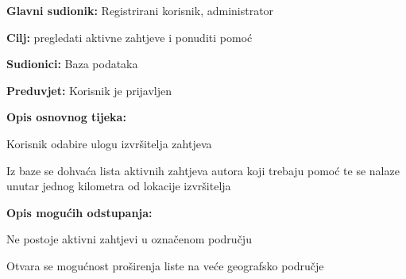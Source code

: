 \noindent {}
\begin{packed_item}
	
	\item \textbf{Glavni sudionik: }Registrirani korisnik, administrator
	\item  \textbf{Cilj:} pregledati aktivne zahtjeve i ponuditi pomoć
	\item  \textbf{Sudionici:} Baza podataka
	\item  \textbf{Preduvjet:} Korisnik je prijavljen
	\item  \textbf{Opis osnovnog tijeka:}
	
	\item[] \begin{packed_enum}
		
		\item Korisnik odabire ulogu izvršitelja zahtjeva
		\item Iz baze se dohvaća lista aktivnih zahtjeva autora koji trebaju pomoć te se nalaze unutar jednog kilometra od lokacije izvršitelja
	\end{packed_enum}
	
	\item  \textbf{Opis mogućih odstupanja:}
	
	\item[] \begin{packed_item}
		
		\item[2.a] Ne postoje aktivni zahtjevi u označenom području
		\item[] \begin{packed_enum}
			
			\item Otvara se mogućnost proširenja liste na veće geografsko područje
			
		\end{packed_enum}
	\end{packed_item}
\end{packed_item}
\noindent {}
